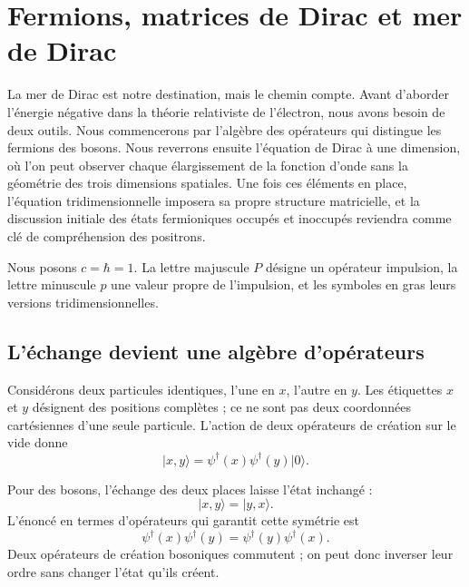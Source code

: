 \chapter{Fermions, matrices de Dirac et mer de Dirac}

La mer de Dirac est notre destination, mais le chemin compte. Avant d’aborder l’énergie négative dans la théorie relativiste de l’électron, nous avons besoin de deux outils. Nous commencerons par l’algèbre des opérateurs qui distingue les fermions des bosons. Nous reverrons ensuite l’équation de Dirac à une dimension, où l’on peut observer chaque élargissement de la fonction d’onde sans la géométrie des trois dimensions spatiales. Une fois ces éléments en place, l’équation tridimensionnelle imposera sa propre structure matricielle, et la discussion initiale des états fermioniques occupés et inoccupés reviendra comme clé de compréhension des positrons.

Nous posons \(c=\hbar=1\). La lettre majuscule \(P\) désigne un opérateur impulsion, la lettre minuscule \(p\) une valeur propre de l’impulsion, et les symboles en gras leurs versions tridimensionnelles.

\section{L’échange devient une algèbre d’opérateurs}

Considérons deux particules identiques, l’une en \(x\), l’autre en \(y\). Les étiquettes \(x\) et \(y\) désignent des positions complètes ; ce ne sont pas deux coordonnées cartésiennes d’une seule particule. L’action de deux opérateurs de création sur le vide donne
\begin{equation}
\lvert x,y\rangle
=
\psi^\dagger(x)\psi^\dagger(y)\lvert0\rangle.
\label{eq:l10-two-particle-state}
\end{equation}

Pour des bosons, l’échange des deux places laisse l’état inchangé :
\begin{equation}
\lvert x,y\rangle=\lvert y,x\rangle.
\end{equation}
L’énoncé en termes d’opérateurs qui garantit cette symétrie est
\begin{equation}
\psi^\dagger(x)\psi^\dagger(y)
=
\psi^\dagger(y)\psi^\dagger(x).
\label{eq:l10-boson-exchange}
\end{equation}
Deux opérateurs de création bosoniques commutent ; on peut donc inverser leur ordre sans changer l’état qu’ils créent.

